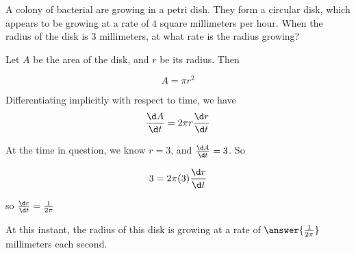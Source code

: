 \documentclass{ximera}
\author{Steven Gubkin}
\begin{document}
\begin{exercise}



        		A colony of bacterial are growing in a petri dish.  They form a circular disk, which appears to be growing at a rate of $4$ square millimeters per hour.  When the radius of the disk is $3$ millimeters, at what rate is the radius growing?

\begin{hint}
	Let $A$ be the area of the disk, and $r$ be its radius.  Then

\[
A = \pi r^2
\]
\end{hint}

\begin{hint}
	Differentiating implicitly with respect to time, we have
\[
\frac{\d A}{\d t} = 2\pi r \frac{\d r}{\d t}
\]
\end{hint}

\begin{hint}
	At the time in question, we know $r = 3$, and $\frac{\d A}{\d t} = 3$.  So 

\[
3 = 2 \pi (3) \frac{\d r}{\d t}
\]

so $\frac{\d r}{\d t} = \frac{1}{2\pi}$
\end{hint}

\begin{prompt}
	At this instant, the radius of this disk is growing at a rate of $\answer{\frac{1}{2\pi}}$ millimeters each second.
\end{prompt}

\end{exercise}
\end{document}
